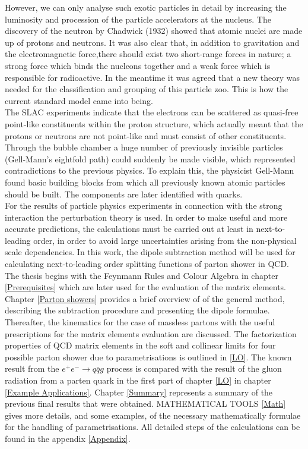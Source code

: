 However, we can only analyse such exotic particles in detail by increasing the luminosity and procession of the particle accelerators at the nucleus. 
The discovery of the neutron by Chadwick (1932) showed that atomic nuclei are made up of protons and neutrons. It was also clear that, in addition to gravitation and the electromagnetic force,there should exist two short-range forces in nature; a strong force which binds the nucleons together and a weak force which is responsible for radioactive.
In the meantime it was agreed that a new theory was needed for the classification and grouping of this particle zoo. This is how the current standard model came into being.\\
The SLAC experiments indicate that the electrons can be scattered as quasi-free point-like constituents within the proton structure, which actually meant that the protons or neutrons are not point-like and must consist of other constituents. Through the bubble chamber a huge number of previously invisible particles (Gell-Mann's eightfold path) could suddenly be made visible, which represented contradictions to the previous physics. To explain this, the physicist Gell-Mann found basic building blocks from which all previously known atomic particles should be built. The components are later identified with quarks.\\
For the results of particle physics experiments in connection with the strong interaction the perturbation theory is used. In order to make useful and more accurate predictions, the calculations must be carried out at least in next-to-leading order, in order to avoid large uncertainties arising from the non-physical scale dependencies.   
In this work, the dipole subtraction method will be used for calculating next-to-leading order splitting functions of parton shower in QCD.\\
The thesis begins with the Feynmann Rules and Colour Algebra in chapter \ref{Prerequisites} which are later used for the evaluation of the matrix elements.
Chapter \ref{Parton showers} provides a brief overview of of the general method, describing the subtraction procedure and presenting the dipole formulae. Thereafter, the kinematics for the case of massless  partons with the useful prescriptions for the matrix elements evaluation are discussed. The factorization properties of QCD matrix elements in the soft and collinear limits for four possible parton shower due to parametrisations is outlined in \ref{LO}. The known result from the $ e^{+}e^{-} \rightarrow q \bar{q} g $ process is compared with the result of the gluon radiation from a parten quark in the first part of chapter \ref{LO} in chapter \ref{Example Applications}. 
Chapter \ref{Summary} represents  a  summary  of  the  previous final results  that  were  obtained. MATHEMATICAL TOOLS \ref{Math} gives more details, and some examples, of the necessary mathematically formulae for the handling of parametrisations. All detailed steps of the calculations can be found in the appendix \ref{Appendix}.

 